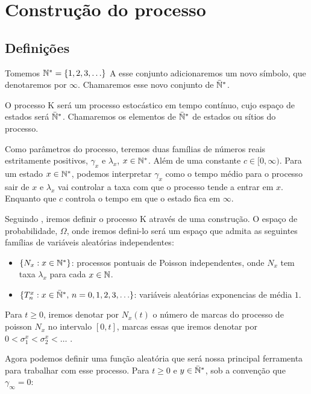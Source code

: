 \chapter{Construção do processo}
\label{cap:construcao}

\section{Definições}
\label{sec:definicoes}

Tomemos ${\mathbb{N^*}} = \{ 1, 2, 3, \ldots\}$ A esse conjunto adicionaremos um
novo símbolo, que denotaremos por $\infty$. Chamaremos esse novo
conjunto de ${\mathbb{\bar{N}^*}}$.

O processo K será um processo estocástico em tempo contínuo, cujo
espaço de estados será ${\mathbb{\bar{N}^*}}$. Chamaremos os elementos de ${\mathbb{\bar{N}^*}}$ de
estados ou sítios do processo.

Como parâmetros do processo, teremos duas famílias de números reais
estritamente positivos, $\gamma_x$ e $\lambda_x$, $x \in {\mathbb{N^*}}$. Além de
uma constante $c \in [0, \infty)$.  Para um estado $x \in {\mathbb{N^*}}$,
podemos interpretar $\gamma_x$ como o tempo médio para o processo sair
de $x$ e $\lambda_x$ vai controlar a taxa com que o processo tende a
entrar em $x$. Enquanto que $c$ controla o tempo em que o estado fica
em $\infty$.

Seguindo \cite{fontes:08}, iremos definir o processo K através de uma
construção. O espaço de probabilidade, $\Omega$, onde iremos defini-lo
será um espaço que admita as seguintes famílias de variáveis
aleatórias independentes:

\begin{itemize}
\item $\{ N_x: x \in {\mathbb{N^*}} \}$: processos pontuais de Poisson
  independentes, onde $N_x$ tem taxa $\lambda_x$ para cada $x \in {\mathbb{N}}$.
\item $\{T_n^x: x \in {\mathbb{\bar{N}^*}} , \, n = 0, 1, 2, 3, \ldots \}$: variáveis
  aleatórias exponencias de média $1$.
\end{itemize}

Para $t \geq 0$, iremos denotar por $N_x(t)$ o número de marcas do
processo de poisson $N_x$ no intervalo $[0, t]$, marcas essas que
iremos denotar por $0 < \sigma_1^x < \sigma_2^x < \ldots$ .

Agora podemos definir uma função aleatória que será nossa principal
ferramenta para trabalhar com esse processo. Para $t \geq 0$ e $y \in
{\mathbb{\bar{N}^*}}$, sob a convenção que $\gamma_\infty = 0$:

